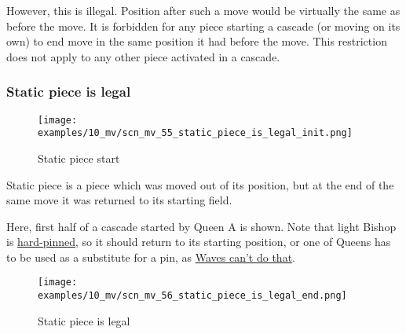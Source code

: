 However, this is illegal. Position after such a move would be virtually the same
as before the move. It is forbidden for any piece starting a cascade (or moving
on its own) to end move in the same position it had before the move. This
restriction does not apply to any other piece activated in a cascade.

\clearpage %

\subsubsection*{Static piece is legal}
\label{sec:Miranda's veil/Wave/Cascading Waves/Static piece is legal}

\vspace*{-1.4\baselineskip}
\noindent
\begin{figure}[!h]
\texttt{[image: examples/10\_mv/scn\_mv\_55\_static\_piece\_is\_legal\_init.png]}
\vspace*{-1.3\baselineskip}
\caption{Static piece start}
\label{fig:scn_mv_55_static_piece_is_legal_init}
\end{figure}

\vspace*{-0.4\baselineskip}
Static piece is a piece which was moved out of its position, but at the end of the
same move it was returned to its starting field.

Here, first half of a cascade started by Queen A is shown. Note that light Bishop
is \href{https://en.wikipedia.org/wiki/Pin_(chess)#Absolute_pin}{hard-pinned}, so
it should return to its starting position, or one of Queens has to be used as a
substitute for a pin, as
\hyperref[fig:scn_mv_45_pinned_piece_cascaded_init]{Waves can't do that}.

\clearpage %

\vspace*{-2.1\baselineskip}
\noindent
\begin{figure}[!h]
\texttt{[image: examples/10\_mv/scn\_mv\_56\_static\_piece\_is\_legal\_end.png]}
\vspace*{-1.3\baselineskip}
\caption{Static piece is legal}
\label{fig:scn_mv_56_static_piece_is_legal_end}
\end{figure}

